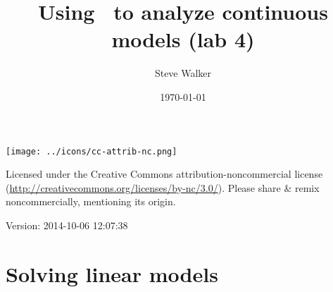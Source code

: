 \documentclass[11pt]{article}\usepackage[]{graphicx}\usepackage[]{color}
\title{Using \R\ to analyze continuous models (lab 4)}
\date{\today}
\author{Steve Walker}}
\numberwithin{exercise}{section}
\begin{document}
\maketitle

\texttt{[image: ../icons/cc-attrib-nc.png]}

\begin{minipage}[b]{3in}
{\small Licensed under the Creative Commons 
  attribution-noncommercial license
(\url{http://creativecommons.org/licenses/by-nc/3.0/}).
Please share \& remix noncommercially,
mentioning its origin.}
\end{minipage}

Version: 2014-10-06 12:07:38
  

\section{Solving linear models}
\end{document}
